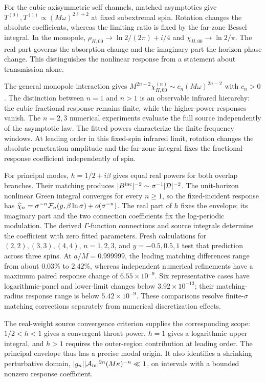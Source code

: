 \documentclass[aps,prd,twocolumn,10pt,nofootinbib,superscriptaddress,floatfix]{revtex4-2}
\begin{document}
For the cubic axisymmetric self channels, matched asymptotics give
$T^{(0)},T^{(1)}\propto(M\omega)^{2\ell+2}$ at fixed subextremal spin.
Rotation changes the absolute coefficients, whereas the limiting ratio
is fixed by the far-zone Bessel integral.  In the monopole,
$\rho_{H,00}\to\ln2/(2\pi)+i/4$ and
$\chi_{H,00}\to\ln2/\pi$.  The real part governs the absorption change and
the imaginary part the horizon phase change.  This distinguishes the
nonlinear response from a statement about transmission alone.

The general monopole interaction gives
$M^{2n-2}\chi_{H,00}^{(n)}\sim c_n(M\omega)^{2n-2}$ with $c_n>0$.
The distinction between $n=1$ and $n>1$ is an observable infrared hierarchy:
the cubic fractional response remains finite, while the higher-power
responses vanish.  The $n=2,3$ numerical experiments evaluate the full source
independently of the asymptotic law.  The fitted powers characterize the
finite frequency windows.  At leading order in this fixed-spin infrared
limit, rotation changes the absolute penetration amplitude and the far-zone
integral fixes the fractional-response coefficient independently of spin.

For principal modes, $h=1/2+i\beta$ gives equal real powers for both overlap
branches.  Their matching produces $|B^{\rm inc}|^{-2}\sim\sigma^{-1}
|{\cal D}|^{-2}$.  The unit-horizon nonlinear Green integral converges for
every $n\ge1$, so the fixed-incident response has
$\widehat\chi_n=\sigma^{-n}{\cal F}_n(y,\beta\ln\sigma)+o(\sigma^{-n})$.
The real part of $h$ fixes the envelope; its imaginary part and the two
connection coefficients fix the log-periodic modulation.  The derived
$\Gamma$-function connections and source integrals determine the coefficient
with zero fitted parameters.  Fresh calculations for $(2,2),(3,3),(4,4)$,
$n=1,2,3$, and $y=-0.5,0.5,1$ test that prediction across three spins.
At $a/M=0.999999$, the leading matching differences range from about
$0.03\%$ to $2.42\%$, whereas independent numerical refinements have a
maximum paired response change of $6.55\times10^{-9}$.
Six representative cases have logarithmic-panel and lower-limit changes
below $3.92\times10^{-13}$; their matching-radius response range is below
$5.42\times10^{-9}$.  These comparisons resolve finite-$\sigma$
matching corrections separately from numerical discretization effects.

The real-weight source convergence criterion supplies the corresponding
scope: $1/2<h<1$ gives a convergent throat power, $h=1$ gives a logarithmic
upper integral, and $h>1$ requires the outer-region contribution at leading
order.  The principal envelope thus has a precise modal origin.  It also
identifies a shrinking perturbative domain,
$|g_n||{\cal A}_{\rm in}|^{2n}(M\kappa)^{-n}\ll1$, on intervals with
a bounded nonzero response coefficient.
\end{document}
